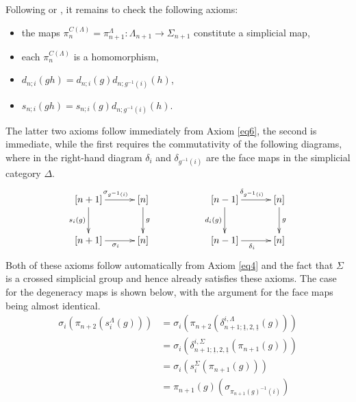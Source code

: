 \begin{rem}
Following \cite[Definition~1.3]{Kra87} or \cite[Proposition~1.7]{FL91}, it remains to check the following axioms:
    \begin{itemize}
        \item the maps $\pi^{C(\Lambda)}_n = \pi^\Lambda_{n+1} \colon \Lambda_{n+1} \rightarrow \Sigma_{n+1}$ constitute a simplicial map,
        \item each $\pi^{C(\Lambda)}_n$ is a homomorphism,
        \item $d_{n;i}(gh) = d_{n;i}(g)d_{n;g^{-1}(i)}(h)$, 
        \item $s_{n;i}(gh) = s_{n;i}(g)d_{n;g^{-1}(i)}(h)$.
    \end{itemize}
The latter two axioms follow immediately from Axiom \eqref{eq6}, the second is immediate, while the first requires the commutativity of the following diagrams, where in the right-hand diagram $\delta_i$ and $\delta_{g^{-1}(i)}$ are the face maps in the simplicial category $\Delta$.
        \[
            \xy
                (0,0)*+{[n+1]}="00";
                (20,0)*+{[n]}="10";
                (0,-15)*+{[n+1]}="01";
                (20,-15)*+{[n]}="11";
                {\ar^{\sigma_{g^{-1}(i)}} "00" ; "10"};
                {\ar^{g} "10" ; "11"};
                {\ar_{s_{i}(g)} "00" ;  "01"};
                {\ar_{\sigma_{i}} "01" ; "11"};
                (50,0)*+{[n-1]}="00";
                (70,0)*+{[n]}="10";
                (50,-15)*+{[n-1]}="01";
                (70,-15)*+{[n]}="11";
                {\ar^{\delta_{g^{-1}(i)}} "00" ; "10"};
                {\ar^{g} "10" ; "11"};
                {\ar_{d_{i}(g)} "00" ;  "01"};
                {\ar_{\delta_{i}} "01" ; "11"};
            \endxy
        \]
Both of these axioms follow automatically from Axiom \eqref{eq4} and the fact that $\Sigma$ is a crossed simplicial group and hence already satisfies these axioms. The case for the degeneracy maps is shown below, with the argument for the face maps being almost identical.
    \begin{align*}
        \sigma_i(\pi_{n+2}(s_i^\Lambda(g))) &= \sigma_i(\pi_{n+2}(\delta^{i,\Lambda}_{n+1;\underline{1},2,\underline{1}}(g))) \\
        &= \sigma_i(\delta^{i,\Sigma}_{n+1;\underline{1},2,\underline{1}}(\pi_{n+1}(g))) \\
        &= \sigma_i(s_i^{\Sigma}(\pi_{n+1}(g))) \\
        &= \pi_{n+1}(g)(\sigma_{\pi_{n+1}(g)^{-1}(i)})
    \end{align*}


\end{rem}
